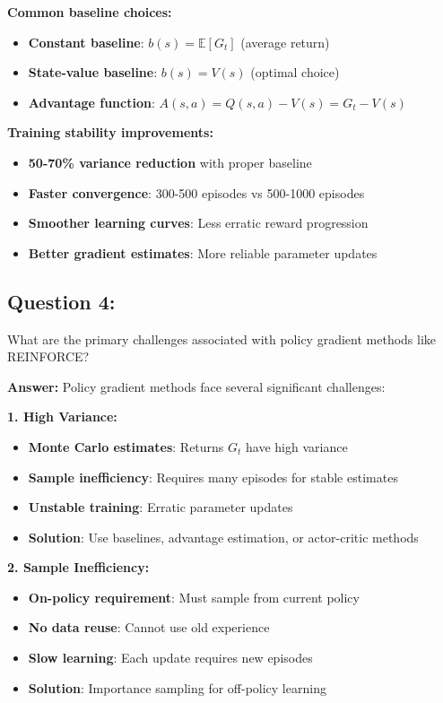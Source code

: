 \documentclass[12pt]{article}
\begin{document}
{{{\textbf{Common baseline choices:}
\begin{itemize}
    \item \textbf{Constant baseline}: $b(s) = \mathbb{E}[G_t]$ (average return)
    \item \textbf{State-value baseline}: $b(s) = V(s)$ (optimal choice)
    \item \textbf{Advantage function}: $A(s,a) = Q(s,a) - V(s) = G_t - V(s)$
\end{itemize}

\textbf{Training stability improvements:}
\begin{itemize}
    \item \textbf{50-70\% variance reduction} with proper baseline
    \item \textbf{Faster convergence}: 300-500 episodes vs 500-1000 episodes
    \item \textbf{Smoother learning curves}: Less erratic reward progression
    \item \textbf{Better gradient estimates}: More reliable parameter updates
\end{itemize}

\subsection{Question 4:}

What are the primary challenges associated with policy gradient methods like REINFORCE?
\vspace*{0.3cm}

\textbf{Answer:} Policy gradient methods face several significant challenges:

\textbf{1. High Variance:}
\begin{itemize}
    \item \textbf{Monte Carlo estimates}: Returns $G_t$ have high variance
    \item \textbf{Sample inefficiency}: Requires many episodes for stable estimates
    \item \textbf{Unstable training}: Erratic parameter updates
    \item \textbf{Solution}: Use baselines, advantage estimation, or actor-critic methods
\end{itemize}

\textbf{2. Sample Inefficiency:}
\begin{itemize}
    \item \textbf{On-policy requirement}: Must sample from current policy
    \item \textbf{No data reuse}: Cannot use old experience
    \item \textbf{Slow learning}: Each update requires new episodes
    \item \textbf{Solution}: Importance sampling for off-policy learning
\end{itemize}

}}}
\end{document}
